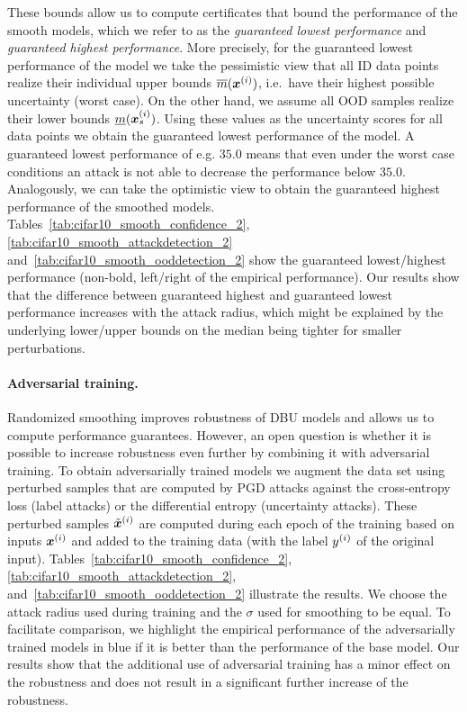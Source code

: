 These bounds allow us to compute certificates that bound the performance of the smooth models, which we refer to as the \emph{guaranteed lowest performance} and \emph{guaranteed highest performance}. More precisely, for the guaranteed lowest performance of the model we take the pessimistic view that all ID data points realize their individual upper bounds $\overline{m}({\bm{x}}^{(i)})$, i.e.\ have their highest possible uncertainty (worst case). On the other hand, we assume all OOD samples realize their lower bounds $\underline{m}({\bm{x}}^{(i)}_s)$. Using these values as the uncertainty scores for all data points we obtain the guaranteed lowest performance of the model. 
A guaranteed lowest performance of e.g. $35.0$ means that even under the worst case conditions an attack is not able to decrease the performance below $35.0$. 
Analogously, we can take the optimistic view to obtain the guaranteed highest performance of the smoothed models. 
%
Tables~\ref{tab:cifar10_smooth_confidence_2}, \ref{tab:cifar10_smooth_attackdetection_2} and~\ref{tab:cifar10_smooth_ooddetection_2} show the guaranteed lowest/highest performance (non-bold, left/right of the empirical performance). 
Our results show that the difference between guaranteed highest and guaranteed lowest performance increases with the attack radius, which might be explained by the underlying lower/upper bounds on the median being tighter for smaller perturbations. 
%


\paragraph{Adversarial training.}
Randomized smoothing improves robustness of DBU models and allows us to compute performance guarantees. However, an open question is whether it is possible to increase robustness even further by combining it with adversarial training. To obtain adversarially trained models we augment the data set using perturbed samples that are computed by PGD attacks against the cross-entropy loss (label attacks) or the differential entropy (uncertainty attacks). These perturbed samples $\tilde{{\bm{x}}}^{(i)}$ are computed during each epoch of the training based on inputs ${\bm{x}}^{(i)}$ and added to the training data (with the label $y^{(i)}$ of the original input). 
Tables~\ref{tab:cifar10_smooth_confidence_2}, \ref{tab:cifar10_smooth_attackdetection_2}, and~\ref{tab:cifar10_smooth_ooddetection_2} illustrate the results. We choose the attack radius used during training and the $\sigma$ used for smoothing to be equal. %
To facilitate comparison, we highlight the empirical performance of the adversarially trained models in blue if it is better than the performance of the base model. Our results show that the additional use of adversarial training has a minor effect on the robustness and does not result in a significant further increase of the robustness. 

